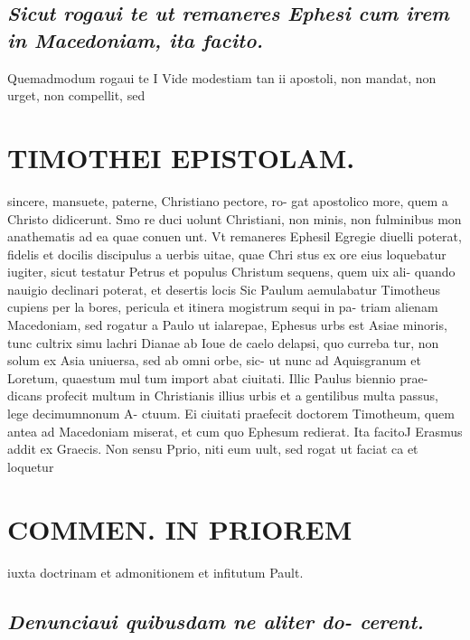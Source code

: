 \documentclass{article}
\begin{document}
\begin{pages}
\subsection*{\textit{Sicut rogaui te ut remaneres Ephesi cum irem in Macedoniam, ita facito. }}\pstart Quemadmodum rogaui te I Vide modestiam tan ii apostoli, non mandat, non urget, non compellit, sed  \pend
\section*{TIMOTHEI EPISTOLAM. }
\marginpar{[ p.11 ]}\pstart sincere, mansuete, paterne, Christiano pectore, ro- gat apostolico more, quem a Christo didicerunt. Smo re duci uolunt Christiani, non minis, non fulminibus mon anathematis ad ea quae conuen unt.  \pend\pstart Vt remaneres Ephesil Egregie diuelli poterat, fidelis et docilis discipulus a uerbis uitae, quae Chri stus ex ore eius loquebatur iugiter, sicut testatur Petrus et populus Christum sequens, quem uix ali- quando nauigio declinari poterat, et desertis locis Sic Paulum aemulabatur Timotheus cupiens per la bores, pericula et itinera mogistrum sequi in pa- triam alienam Macedoniam, sed rogatur a Paulo ut  \pend\pstart ialarepae, Ephesus urbs est Asiae minoris, tunc cultrix simu lachri Dianae ab Ioue de caelo delapsi, quo curreba tur, non solum ex Asia uniuersa, sed ab omni orbe, sic- ut nunc ad Aquisgranum et Loretum, quaestum mul tum import abat ciuitati. Illic Paulus biennio prae- dicans profecit multum in Christianis illius urbis et a gentilibus multa passus, lege decimumnonum A- ctuum. Ei ciuitati praefecit doctorem Timotheum, quem antea ad Macedoniam miserat, et cum quo Ephesum redierat.  \pend\pstart Ita facitoJ Erasmus addit ex Graecis. Non sensu Pprio, niti eum uult, sed rogat ut faciat ca et loquetur  \pend
\section*{COMMEN. IN PRIOREM }
\marginpar{[ p.12 ]}\pstart iuxta doctrinam et admonitionem et infitutum Pault.  \pend
{}
{}
\subsection*{\textit{Denunciaui quibusdam ne aliter do- cerent. }}
{}

\end{pages}
\end{document}
